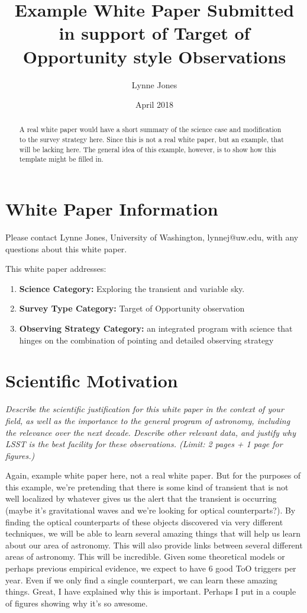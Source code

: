 \documentclass[12pt, letterpaper]{article}
\title{Example White Paper Submitted in support of Target of Opportunity style Observations}
\author{Lynne Jones}
\date{April 2018}
\begin{document}
\maketitle

\begin{abstract}
A real white paper would have a short summary of the science case and modification to the survey strategy
here. Since this is not a real white paper, but an example, that will be lacking here. The general idea of this
example, however, is to show how this template might be filled in. 
\end{abstract}

\section{White Paper Information}
Please contact Lynne Jones, University of Washington, lynnej@uw.edu, with any questions about this white paper. 

This white paper addresses:
\begin{enumerate} 
\item {\bf Science Category:} Exploring the transient and variable sky.
\item {\bf Survey Type Category:} Target of Opportunity observation
\item {\bf Observing Strategy Category:} an integrated program with science that hinges on the combination of pointing and detailed observing strategy
\end{enumerate}  

\clearpage

\section{Scientific Motivation}

\begin{footnotesize}
{\it Describe the scientific justification for this white paper in the context
of your field, as well as the importance to the general program of astronomy, 
including the relevance over the next decade. 
Describe other relevant data, and justify why LSST is the best facility for these observations.
(Limit: 2 pages + 1 page for figures.)}
\end{footnotesize}

Again, example white paper here, not a real white paper. But for the purposes of this
example, we're pretending that there is some kind of transient that is not well localized
by whatever gives us the alert that the transient is occurring (maybe it's gravitational waves 
and we're looking for optical counterparts?).  By finding the optical counterparts of
these objects discovered via very different techniques, we will be able to learn 
several amazing things that will help us learn about our area of astronomy. This will 
also provide links between several different areas of astronomy. This will be incredible. 
Given some theoretical models or perhaps previous empirical evidence, we expect to have 6 good ToO triggers per year. 
Even if we only find a single counterpart, we can learn these amazing things.
Great, I have explained why this is important.  Perhaps I put in a couple of figures showing why it's so awesome.
\end{document}
